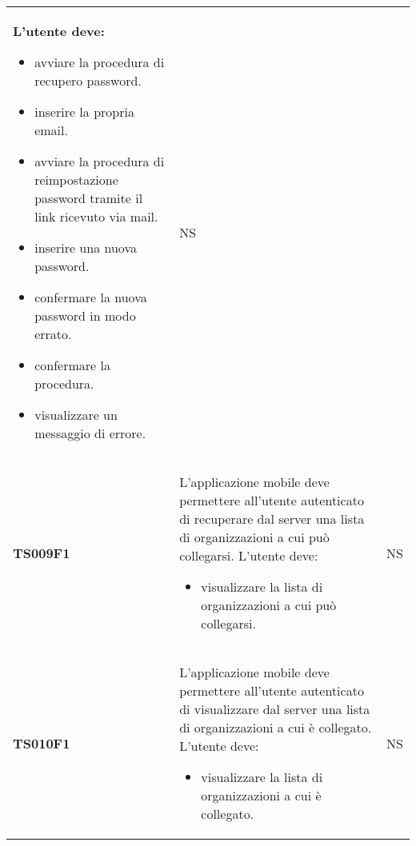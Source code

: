 \documentclass[../piano-di-qualifica.tex]{subfiles}
\begin{document}
\begin{longtable}[H]{>{\centering\bfseries}m{3cm} >{}m{10cm} >{\centering\arraybackslash}m{3cm}}
  L'utente deve:
  \begin{itemize}
    \item avviare la procedura di recupero password.
    \item inserire la propria email.
    \item avviare la procedura di reimpostazione password tramite il link ricevuto via mail.
    \item inserire una nuova password.
    \item confermare la nuova password in modo errato.
    \item confermare la procedura.
    \item visualizzare un messaggio di errore.
  \end{itemize}
                     & NS                                                                                                                                                                                                                                                               \\
  TS009F1            & L'applicazione mobile deve permettere all'utente autenticato di recuperare dal server una lista di organizzazioni a cui può collegarsi. \newline
  L'utente deve:
  \begin{itemize}
    \item visualizzare la lista di organizzazioni a cui può collegarsi.
  \end{itemize}
                     & NS                                                                                                                                                                                                                                                               \\
  TS010F1            & L'applicazione mobile deve permettere all'utente autenticato di visualizzare dal server una lista di organizzazioni a cui è collegato. \newline
  L'utente deve:
  \begin{itemize}
    \item visualizzare la lista di organizzazioni a cui è collegato.
  \end{itemize}
                     & NS                                                                                                                                                                                                                                                               \\

\end{longtable}
\end{document}

